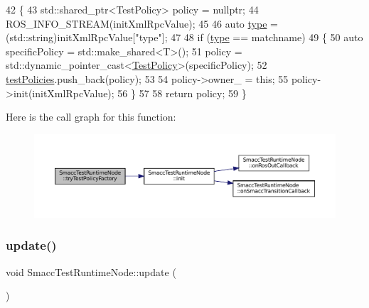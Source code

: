 \begin{DoxyCode}
42   \{
43     std::shared\_ptr<TestPolicy> policy = \textcolor{keyword}{nullptr};
44     ROS\_INFO\_STREAM(initXmlRpcValue);
45 
46     \textcolor{keyword}{auto} \hyperlink{namespacegenerate__debs_a50bc9a7ecac9584553e089a448bcde58}{type} = (std::string)initXmlRpcValue[\textcolor{stringliteral}{"type"}];
47 
48     \textcolor{keywordflow}{if} (\hyperlink{namespacegenerate__debs_a50bc9a7ecac9584553e089a448bcde58}{type} == matchname)
49     \{
50       \textcolor{keyword}{auto} specificPolicy = std::make\_shared<T>();
51       policy = std::dynamic\_pointer\_cast<\hyperlink{classTestPolicy}{TestPolicy}>(specificPolicy);
52       \hyperlink{classSmaccTestRuntimeNode_a099952c0249a6f4f94469d991a644b69}{testPolicies}.push\_back(policy);
53 
54       policy->owner\_ = \textcolor{keyword}{this};
55       policy->init(initXmlRpcValue);
56     \}
57 
58     \textcolor{keywordflow}{return} policy;
59   \}
\end{DoxyCode}
Here is the call graph for this function\+:
\nopagebreak
\begin{figure}[H]
\begin{center}
\leavevmode
\includegraphics[width=350pt]{classSmaccTestRuntimeNode_ab92c2ceafa6b65919f306c1818fae551_cgraph}
\end{center}
\end{figure}
\mbox{\label{classSmaccTestRuntimeNode_a0cdde5c108219ca3d7db941676fc1dcf}} 
\subsubsection{\texorpdfstring{update()}{update()}}
{\footnotesize\ttfamily void Smacc\+Test\+Runtime\+Node\+::update (\begin{DoxyParamCaption}{ }\end{DoxyParamCaption})\hspace{0.3cm}{\ttfamily [inline]}}



